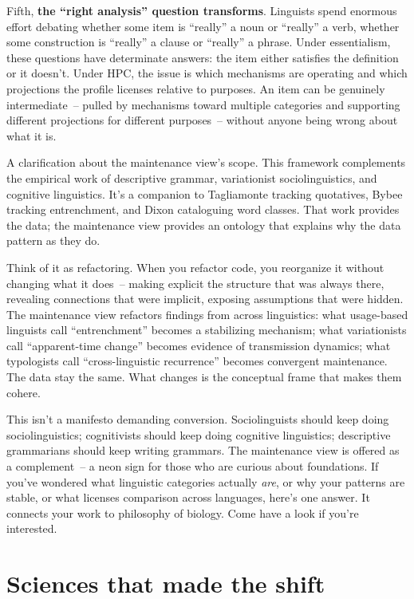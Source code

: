 Fifth, \textbf{the \enquote{right analysis} question transforms}. Linguists spend enormous effort debating whether some item is \enquote{really} a noun or \enquote{really} a verb, whether some construction is \enquote{really} a clause or \enquote{really} a phrase. Under essentialism, these questions have determinate answers: the item either satisfies the definition or it doesn't. Under HPC, the issue is which mechanisms are operating and which projections the profile licenses relative to purposes. An item can be genuinely intermediate~-- pulled by mechanisms toward multiple categories and supporting different projections for different purposes~-- without anyone being wrong about what it is.

A clarification about the maintenance view's scope. This framework complements the empirical work of descriptive grammar, variationist sociolinguistics, and cognitive linguistics. It's a companion to Tagliamonte tracking quotatives, Bybee tracking entrenchment, and Dixon cataloguing word classes. That work provides the data; the maintenance view provides an ontology that explains why the data pattern as they do.

Think of it as refactoring. When you refactor code, you reorganize it without changing what it does~-- making explicit the structure that was always there, revealing connections that were implicit, exposing assumptions that were hidden. The maintenance view refactors findings from across linguistics: what usage-based linguists call \enquote{entrenchment} becomes a stabilizing mechanism; what variationists call \enquote{apparent-time change} becomes evidence of transmission dynamics; what typologists call \enquote{cross-linguistic recurrence} becomes convergent maintenance. The data stay the same. What changes is the conceptual frame that makes them cohere.

This isn't a manifesto demanding conversion. Sociolinguists should keep doing sociolinguistics; cognitivists should keep doing cognitive linguistics; descriptive grammarians should keep writing grammars. The maintenance view is offered as a complement~-- a neon sign for those who are curious about foundations. If you've wondered what linguistic categories actually \emph{are}, or why your patterns are stable, or what licenses comparison across languages, here's one answer. It connects your work to philosophy of biology. Come have a look if you're interested.


\section{Sciences that made the shift}
\label{sec:4:precedents}

